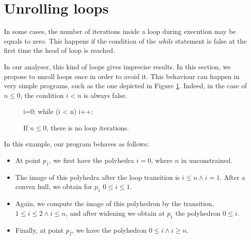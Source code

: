 \documentclass[a4paper,english,titlepage,11pt]{report}
\begin{document}
\section{Unrolling loops}

In some cases, the number of iterations inside a loop during execution 
may be equals to zero. This happens if the condition of the \emph{while}
statement is false at the first time the head of loop is reached.

In our analyser, this kind of loops gives imprecise results. In this section, we
propose to unroll loops once in order to avoid it.
This behaviour can happen in very simple programs, such as the one
depicted in Figure \ref{loop}. Indeed, in the case of $n \leq 0$, the condition
$i < n$ is always false.

\begin{figure}[!h]
\begin{minipage}[c]{.29\linewidth}
\begin{C}
i=0;
while (i < n)
	i++;
\end{C}
\end{minipage}
\begin{minipage}[c]{.69\linewidth}
\centering
{}
\end{minipage}
\caption{If $n \leq 0$, there is no loop iterations.}
\label{loop}
\end{figure}

In this example, our program behaves as follows:
\begin{itemize}
\item At point $p_1$, we first have the polyhedra $i=0$, where $n$ in
unconstrained.
\item The image of this polyhedra after the loop transition is $i \leq n \wedge
i=1$. After a convex hull, we obtain for $p_1$ $0 \leq i \leq 1$.
\item Again, we
compute the image of this polyhedron by the transition, $1 \leq i \leq 2 \wedge
i \leq n$, and after widening we
obtain at $p_1$ the polyhedron $0 \leq i$.
\item Finally, at point $p_f$, we have the polyhedron $0 \leq i \wedge i \geq
n$.
\end{itemize}
\end{document}
